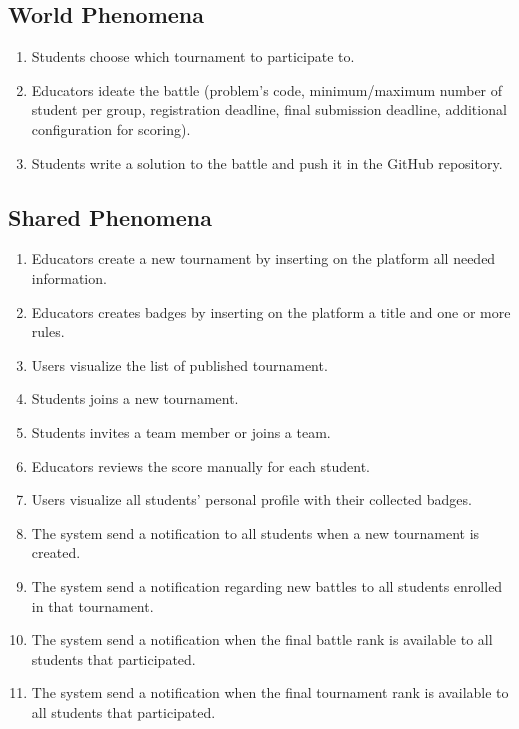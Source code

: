 \subsection{World Phenomena}
\begin{enumerate}[label=\textbf{WP.\arabic*}]
	\item Students choose which tournament to participate to.
	\item Educators ideate the battle (problem's code, minimum/maximum number of student per group, registration deadline, final submission deadline, additional configuration for scoring).
        \item Students write a solution to the battle and push it in the GitHub repository.
\end{enumerate}

\subsection{Shared Phenomena}
\begin{enumerate}[label=\textbf{SP.\arabic*}]
        \item Educators create a new tournament by inserting on the platform all needed information.
        \item Educators creates badges by inserting on the platform a title and one or more rules.
        \item Users visualize the list of published tournament.
        \item Students joins a new tournament.
        \item Students invites a team member or joins a team.
	\item Educators reviews the score manually for each student.
        \item Users visualize all students' personal profile with their collected badges.
        \item The system send a notification to all students when a new tournament is created.
        \item The system send a notification regarding new battles to all students enrolled in that tournament.
        \item The system send a notification when the final battle rank is available to all students that participated.
        \item The system send a notification when the final tournament rank is available to all students that participated.
\end{enumerate}

